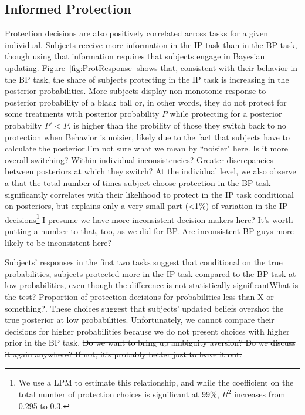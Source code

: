 \documentclass[12pt,a4paper]{article}
\newcommand{\aut}[1]{{\color{Red}#1}}
\newcommand{\pmt}[1]{{\color{Blue}#1}}
\newcommand{\pmst}[1]{{\color{Blue}\sout{#1}}}
\begin{document}
\subsection{Informed Protection}
Protection decisions are also positively correlated across tasks for a given individual.
Subjects receive more information in the IP task than in the BP task, though using that information requires that subjects engage in Bayesian updating.  Figure~\ref{fig:ProtResponse} shows that, consistent with their behavior in the BP task, the share of subjects protecting in the IP task is increasing in the posterior probabilities. More subjects display non-monotonic response to posterior probability of a black ball or, in other words, they do not protect for some  treatments with posterior probability $P$ while protecting for a posterior probabilty $P'<P$.  is higher than the probility of those they  switch back to no protection when Behavior is noisier, likely due to the fact that subjects have to calculate the posterior.\pmt{I'm not sure what we mean by ``noisier" here.  Is it more overall switching?  Within individual inconsistencies?  Greater discrepancies between posteriors at which they switch?}  At the individual level, we also observe a that the total number of times subject choose protection in the BP task significantly correlates with their likelihood to protect in the IP task conditional on posteriors, but explains only a very small part (<1\%) of variation in the IP decisions\footnote{We use a LPM to estimate this relationship, and while the coefficient on the total number of protection choices is significant at 99\%, $R^2$ increases from 0.295 to 0.3.} \pmt{I presume we have more inconsistent decision makers here?  It's worth putting a number to that, too, as we did for BP.  Are inconsistent BP guys more likely to be inconsistent here? }

Subjects' responses in the first two tasks suggest that conditional on the true probabilities, subjects protected more in the IP task compared to the BP task at low probabilities, \aut{even though the difference is not statistically significant}\pmt{What is the test? Proportion of protection decisions for probabilities less than X or something?}. These choices suggest that subjects’ updated beliefs overshot the true posterior at low probabilities.  Unfortunately, we cannot compare their decisions for higher probabilities because we do not present choices with higher prior in the BP task. \pmst{Do we want to bring up ambiguity aversion?  Do we discuss it again anywhere?  If not, it's probably better just to leave it out.}
\end{document}

